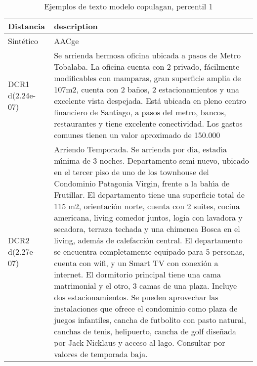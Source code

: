\begin{table}[H]
\centering
\fontsize{10}{14}\selectfont
\caption{Ejemplos de texto modelo copulagan, percentil 1}
\label{table-example-economicos-a-3-copulagan-1p-text}
\begin{tabular}{|l|m{35em}|}
\hline
\rowcolor[gray]{0.8}
Distancia & description \\
\hline Sintético & AACge \\
\hline DCR1 d(2.24e-07) & Se arrienda hermosa oficina ubicada a pasos de Metro Tobalaba.  La oficina cuenta con 2 privado, f\'acilmente modificables con mamparas, gran superficie amplia de 107m2, cuenta con 2 ba\~nos, 2 estacionamientos y una excelente vista despejada. Est\'a ubicada en pleno centro financiero de Santiago, a pasos del metro, bancos, restaurantes y tiene excelente conectividad. Los gastos comunes tienen un valor aproximado de 150.000 \\
\hline DCR2 d(2.27e-07) & Arriendo Temporada. Se arrienda por d{\'\i}a, estad{\'\i}a m{\'\i}nima de 3 noches.  Departamento semi-nuevo, ubicado en el tercer piso de uno de los townhouse del Condominio Patagonia Virgin, frente a la bah{\'\i}a de Frutillar.
 El departamento tiene una superficie total de 115 m2, orientaci\'on norte, cuenta con 2 suites, cocina americana, living comedor juntos, logia con lavadora y secadora, terraza techada y una chimenea Bosca en el living, adem\'as de calefacci\'on central. El departamento se encuentra completamente equipado para 5 personas, cuenta con wifi, y un Smart TV con conexi\'on a internet. El dormitorio principal tiene una cama matrimonial y el otro, 3 camas de una plaza.  Incluye dos estacionamientos.  Se pueden aprovechar las instalaciones que ofrece el condominio como plaza de juegos infantiles, cancha de futbolito con pasto natural, canchas de tenis, helipuerto, cancha de golf dise\~nada por Jack Nicklaus y acceso al lago.  Consultar por valores de temporada baja. \\
\hline
\end{tabular}
\end{table}
